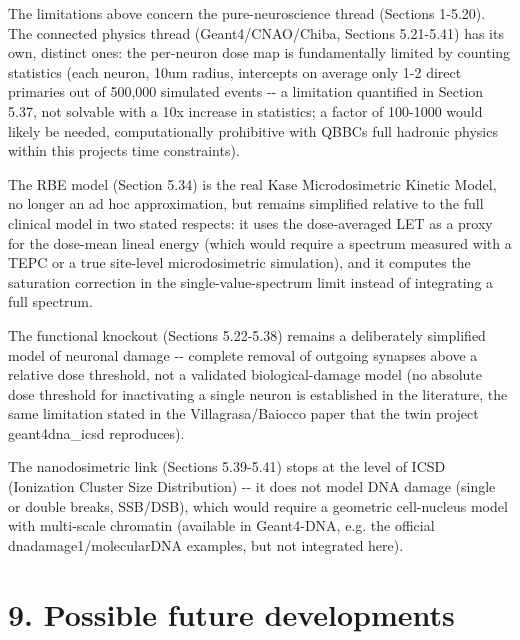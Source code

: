 \documentclass[
  english,
]{article}
\begin{document}
The limitations above concern the pure-neuroscience thread (Sections 1-5.20). The connected physics thread (Geant4/CNAO/Chiba, Sections 5.21-5.41) has its own, distinct ones: the per-neuron dose map is fundamentally limited by counting statistics (each neuron, 10um radius, intercepts on average only 1-2 direct primaries out of 500,000 simulated events -\/- a limitation quantified in Section 5.37, not solvable with a 10x increase in statistics; a factor of 100-1000 would likely be needed, computationally prohibitive with QBBC\textquotesingle s full hadronic physics within this project\textquotesingle s time constraints).

The RBE model (Section 5.34) is the real Kase Microdosimetric Kinetic Model, no longer an ad hoc approximation, but remains simplified relative to the full clinical model in two stated respects: it uses the dose-averaged LET as a proxy for the dose-mean lineal energy (which would require a spectrum measured with a TEPC or a true site-level microdosimetric simulation), and it computes the saturation correction in the single-value-spectrum limit instead of integrating a full spectrum.

The functional knockout (Sections 5.22-5.38) remains a deliberately simplified model of neuronal damage -\/- complete removal of outgoing synapses above a relative dose threshold, not a validated biological-damage model (no absolute dose threshold for inactivating a single neuron is established in the literature, the same limitation stated in the Villagrasa/Baiocco paper that the twin project geant4dna\_\allowbreak{}icsd reproduces).

The nanodosimetric link (Sections 5.39-5.41) stops at the level of ICSD (Ionization Cluster Size Distribution) -\/- it does not model DNA damage (single or double breaks, SSB/DSB), which would require a geometric cell-nucleus model with multi-scale chromatin (available in Geant4-DNA, e.g. the official dnadamage1/molecularDNA examples, but not integrated here).

\section{9. Possible future developments}\label{possible-future-developments}
\end{document}
